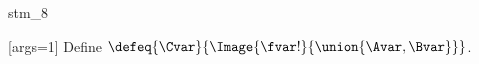 \documentclass{stex}
\begin{document}
\begin{smodule}{stm_8}
  
  \begin{sassertion}[id=stm-8]
    [args=1]{}
    Define $\defeq{\Cvar}{\Image{\fvar!}{\union{\Avar,\Bvar}}}$.
  \end{sassertion}
\end{smodule}
\end{document}
